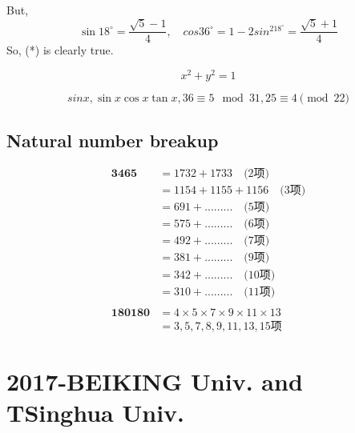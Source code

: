 \documentclass[11pt,a4paper]{article}
\begin{document}
But,
$$\sin18^{\circ}=\frac{\sqrt{5}-1}{4},\quad cos36^{\circ}=1-2sin^218^{\circ}=\frac{\sqrt{5}+1}{4}$$
So, (*) is clearly true.

\begin{equation}
x^2 + y^2 = 1
\end{equation}

\[ sinx, \sin x\cos x \tan x, 36\equiv5\mod{31}, 25\equiv4\pmod{22} \]

\subsection{Natural number breakup}

\begin{CJK}{UTF8}{gbsn}
	
\begin{eqnarray*}
\textbf{3465} & =1732+1733 \quad \text{(2项)} \\
     & =1154+1155+1156 \quad \text{(3项)} \\
     & =691 +......... \quad \text{(5项)} \\
     & =575 +.........  \quad \text{(6项)} \\
     & =492 +.........  \quad \text{(7项)} \\
     & =381 +.........  \quad \text{(9项)} \\
     & =342 +.........  \quad \text{(10项)} \\
     & =310 +.........  \quad \text{(11项)} \\     
\\
\textbf{180180} & = 4 \times 5 \times 7 \times 9 \times 11 \times 13 \\
	& = 3,5,7,8,9,11,13,15 \text{项}
\end{eqnarray*}

\end{CJK}
\newpage
\section{2017-BEIKING Univ. and TSinghua Univ.}
\end{document}
